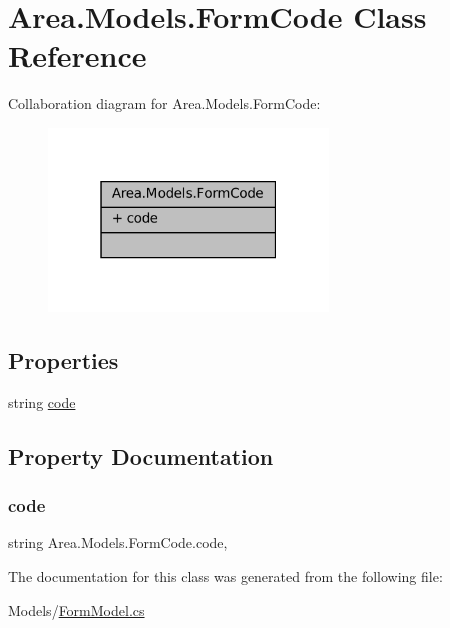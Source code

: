 \hypertarget{classArea_1_1Models_1_1FormCode}{}\section{Area.\+Models.\+Form\+Code Class Reference}
\label{classArea_1_1Models_1_1FormCode}


Collaboration diagram for Area.\+Models.\+Form\+Code\+:
\nopagebreak
\begin{figure}[H]
\begin{center}
\leavevmode
\includegraphics[width=211pt]{classArea_1_1Models_1_1FormCode__coll__graph}
\end{center}
\end{figure}
\subsection*{Properties}
\begin{DoxyCompactItemize}
\item 
string \mbox{\hyperlink{classArea_1_1Models_1_1FormCode_a44e5903ce56830e8acf23a558c27c4ef}{code}}
\end{DoxyCompactItemize}


\subsection{Property Documentation}
\mbox{\label{classArea_1_1Models_1_1FormCode_a44e5903ce56830e8acf23a558c27c4ef}} 
\subsubsection{\texorpdfstring{code}{code}}
{\footnotesize\ttfamily string Area.\+Models.\+Form\+Code.\+code\hspace{0.3cm}{\ttfamily [get]}, {\ttfamily [set]}}



The documentation for this class was generated from the following file\+:\begin{DoxyCompactItemize}
\item 
Models/\mbox{\hyperlink{FormModel_8cs}{Form\+Model.\+cs}}\end{DoxyCompactItemize}
